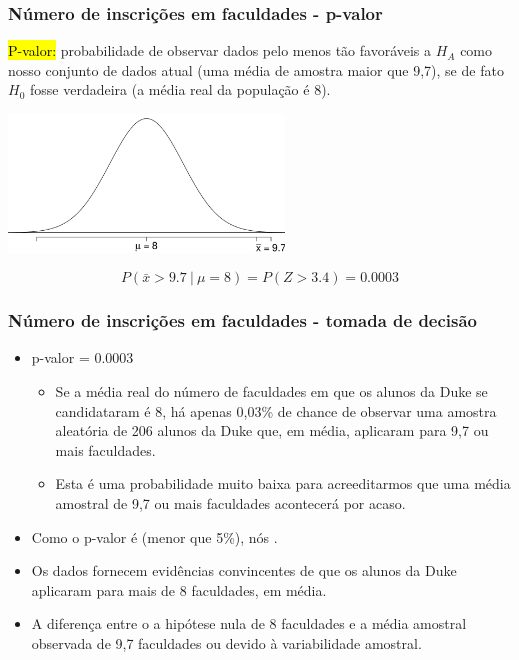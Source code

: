 
\begin{frame}
\frametitle{Número de inscrições em faculdades - p-valor}
\justifying
\hl{P-valor:} probabilidade de observar dados pelo menos tão favoráveis a $H_A$ como nosso conjunto de dados atual (uma média de amostra maior que 9,7), se de fato $H_0$ fosse verdadeira (a média real da população é 8).


\begin{center}
\includegraphics[width=0.55\textwidth]{4-3_hyp_test/app_pval_gr.pdf}
\end{center}

\pause

\[ P(\bar{x} > 9.7~|~\mu = 8) = P(Z > 3.4) = 0.0003 \]

\end{frame}


\begin{frame}
\frametitle{Número de inscrições em faculdades - tomada de decisão}

\begin{itemize}
\justifying
\item p-valor = 0.0003

\pause

\begin{itemize}
\justifying
\item Se a média real do número de faculdades em que os alunos da Duke se candidataram é 8, há apenas 0,03\% de chance de observar uma amostra aleatória de 206 alunos da Duke que, em média, aplicaram para 9,7 ou mais faculdades.

\pause
\justifying
\item Esta é uma probabilidade muito baixa para acreeditarmos que uma média amostral de 9,7 ou mais faculdades acontecerá por acaso.
\end{itemize}

\pause
\justifying
\item Como o p-valor é  (menor que 5\%), nós .

\pause
\justifying
\item Os dados fornecem evidências convincentes de que os alunos da Duke aplicaram para mais de 8 faculdades, em média.

\pause
\justifying
\item A diferença entre o a hipótese nula de 8 faculdades e a média amostral observada de 9,7 faculdades  ou devido à variabilidade amostral.

\end{itemize}

\end{frame}

